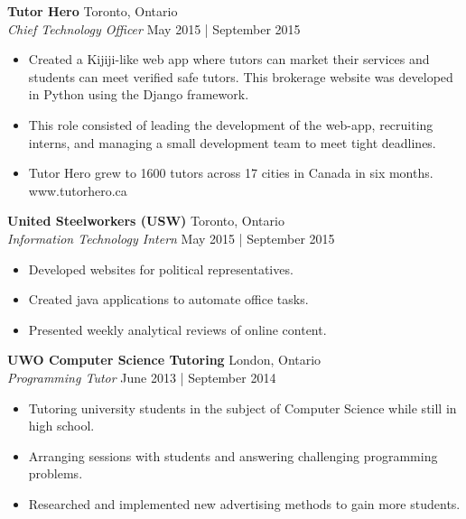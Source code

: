 \documentclass[a4paper]{article}
\begin{document}
\textbf{Tutor Hero} \hfill Toronto, Ontario\\
\textit{Chief Technology Officer} \hfill May 2015 | September 2015\\
\vspace{-1mm}
\begin{itemize} \itemsep 1pt
	\item Created a Kijiji-like web app where tutors can market their services and students can meet verified safe tutors. This brokerage website was developed in Python using the Django framework.  
	\item This role consisted of leading the development of the web-app, recruiting interns, and managing a small development team to meet tight deadlines. 
	\item Tutor Hero grew to 1600 tutors across 17 cities in Canada in six months. www.tutorhero.ca
\end{itemize}

\textbf{United Steelworkers (USW)} \hfill Toronto, Ontario\\
\textit{Information Technology Intern} \hfill May 2015 | September 2015\\
\vspace{-1mm}
\begin{itemize} \itemsep 1pt
	\item Developed websites for political representatives.
	\item Created java applications to automate office tasks.
	\item Presented weekly analytical reviews of online content.
\end{itemize}

\textbf{UWO Computer Science Tutoring} \hfill London, Ontario\\
\textit{Programming Tutor} \hfill June 2013 | September 2014\\
\vspace{-1mm}
\begin{itemize} \itemsep 1pt
	\item Tutoring university students in the subject of Computer Science while still in high school.
	\item Arranging sessions with students and answering challenging programming problems.
	\item Researched and implemented new advertising methods to gain more students.
\end{itemize}
\end{document}
